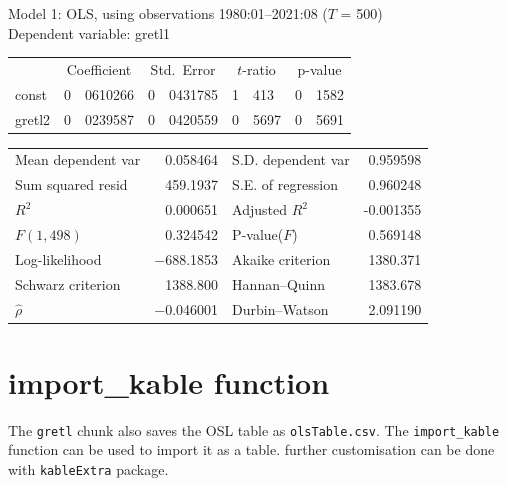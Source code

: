 \documentclass[
  letterpaper,
  DIV=11,
  numbers=noendperiod]{scrartcl}
\begin{document}
\begin{center}

Model 1: OLS, using observations 1980:01--2021:08 ($T$ = 500)\\
Dependent variable: gretl1\\

\vspace{1em}

\begin{tabular}{lr@{.}lr@{.}lr@{.}lr@{.}l}
  &
 \multicolumn{2}{c}{Coefficient} &
  \multicolumn{2}{c}{Std.\ Error} &
   \multicolumn{2}{c}{$t$-ratio} &
    \multicolumn{2}{c}{p-value} \\[1ex]
const &
  0&0610266 &
    0&0431785 &
      1&413 &
        0&1582 \\
gretl2 &
  0&0239587 &
    0&0420559 &
      0&5697 &
        0&5691 \\
\end{tabular}

\vspace{1ex}
\begin{tabular}{lrlr}
Mean dependent var &  0.058464 & S.D. dependent var &  0.959598 \\
Sum squared resid &  459.1937 & S.E. of regression &  0.960248 \\
$R^2$ &  0.000651 & Adjusted $R^2$ & -0.001355 \\
$F(1, 498)$ &  0.324542 & P-value($F$) &  0.569148 \\
Log-likelihood & $-$688.1853 & Akaike criterion &  1380.371 \\
Schwarz criterion &  1388.800 & Hannan--Quinn &  1383.678 \\
$\hat{\rho}$ & $-$0.046001 & Durbin--Watson &  2.091190 \\
\end{tabular}


\end{center}

\hypertarget{import_kable-function}{%
\section{import\_kable function}\label{import_kable-function}}

The \texttt{gretl} chunk also saves the OSL table as
\texttt{olsTable.csv}. The \texttt{import\_kable} function can be used
to import it as a table. further customisation can be done with
\texttt{kableExtra} package.
\end{document}
